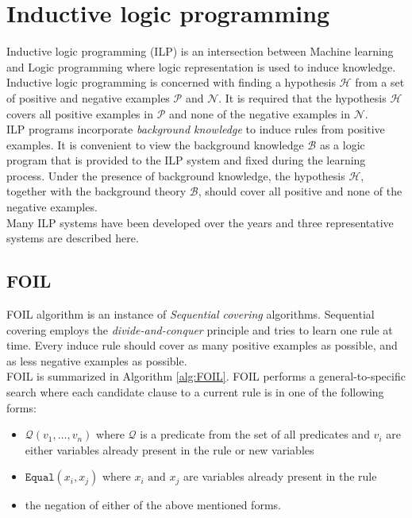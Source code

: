 \section{Inductive logic programming}

Inductive logic programming (ILP) is an intersection between Machine learning and Logic programming where logic representation is used to induce knowledge. Inductive logic programming is concerned with finding a hypothesis $\mathcal{H}$ from a set of positive and negative examples $\mathcal{P}$ and $\mathcal{N}$. It is required that the hypothesis $\mathcal{H}$ covers all positive examples in $\mathcal{P}$ and none of the negative examples in $\mathcal{N}$. \\

ILP programs incorporate \textit{background knowledge} to induce rules from positive examples. It is convenient to view the background knowledge $\mathcal{B}$ as a logic program that is provided to the ILP system and fixed during the learning process. Under the presence of background knowledge, the hypothesis $\mathcal{H}$, together with the background theory $\mathcal{B}$, should cover all positive and none of the negative examples. \\

Many ILP systems have been developed over the years and three representative systems are described here.

\subsection{FOIL}

FOIL algorithm is an instance of \textit{Sequential covering} algorithms. Sequential covering employs the \textit{divide-and-conquer} principle and tries to learn one rule at time. Every induce rule should cover as many positive examples as possible, and as less negative examples as possible. \\

FOIL is summarized in Algorithm \ref{alg:FOIL}. FOIL performs a general-to-specific search where each candidate clause to a current rule is in one of the following forms:

\begin{itemize}
	\item $\mathcal{Q}(v_1,\ldots, v_n)$ where $\mathcal{Q}$ is a predicate from the set of all predicates and $v_i$ are either variables already present in the rule or new variables
	\item $\mathtt{Equal}(x_i, x_j)$ where $x_i \text{ and } x_j$ are variables already present in the rule
	\item the negation of either of the above mentioned forms.
\end{itemize}

